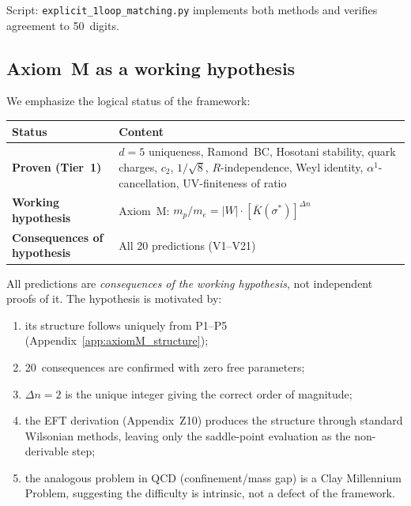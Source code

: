Script: \texttt{explicit\_1loop\_matching.py} implements both methods
and verifies agreement to 50~digits.

\subsection{Axiom~M as a working hypothesis}
\label{sec:axiomM_hypothesis}

We emphasize the logical status of the framework:

\begin{center}
\renewcommand{\arraystretch}{1.2}
\begin{tabular}{lp{8cm}}
\toprule
\textbf{Status} & \textbf{Content}\\
\midrule
\textbf{Proven (Tier~1)} &
  $d=5$ uniqueness, Ramond~BC, Hosotani stability,
  quark charges, $c_2$, $1/\!\sqrt{8}$, $R$-independence,
  Weyl identity, $\alpha^1$-cancellation, UV-finiteness of ratio\\
\textbf{Working hypothesis} &
  Axiom~M: $m_p/m_e=|W|\cdot[\bar K(\sigma^*)]^{\Delta n}$\\
\textbf{Consequences of hypothesis} &
  All 20 predictions (V1--V21)\\
\bottomrule
\end{tabular}
\end{center}

\noindent
All predictions are \emph{consequences of the working hypothesis}, not
independent proofs of it. The hypothesis is motivated by:
\begin{enumerate}[nosep,label=(\roman*)]
\item its structure follows uniquely from P1--P5 (Appendix~\ref{app:axiomM_structure});
\item 20~consequences are confirmed with zero free parameters;
\item $\Delta n=2$ is the unique integer giving the correct order of magnitude;
\item the EFT derivation (Appendix~Z10) produces the structure through
  standard Wilsonian methods, leaving only the saddle-point evaluation
  as the non-derivable step;
\item the analogous problem in QCD (confinement/mass gap) is a Clay
  Millennium Problem, suggesting the difficulty is intrinsic, not a
  defect of the framework.
\end{enumerate}

